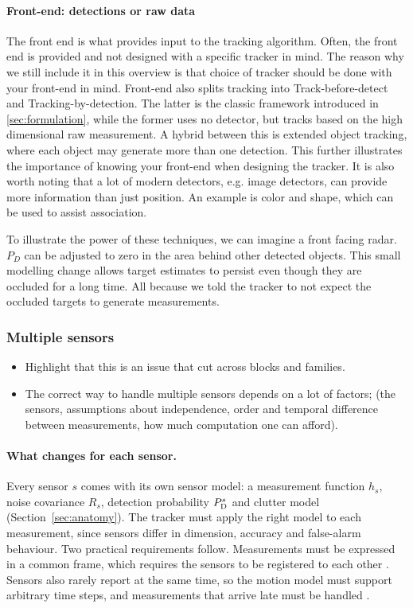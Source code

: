 \paragraph{Front-end: detections or raw data}
The front end is what provides input to the tracking algorithm. Often, the front end is provided and not designed with a specific tracker in mind. The reason why we still include it in this overview is that choice of tracker should be done with your front-end in mind. Front-end also splits tracking into Track-before-detect and Tracking-by-detection. The latter is the classic framework introduced in \autoref{sec:formulation}, while the former uses no detector, but tracks based on the high dimensional raw measurement. A hybrid between this is extended object tracking, where each object may generate more than one detection. This further illustrates the importance of knowing your front-end when designing the tracker. It is also worth noting that a lot of modern detectors, e.g. image detectors, can provide more information than just position. An example is color and shape, which can be used to assist association.

To illustrate the power of these techniques, we can imagine a front facing radar. $P_D$ can be adjusted to zero in the area behind other detected objects. This small modelling change allows target estimates to persist even though they are occluded for a long time. All because we told the tracker to not expect the occluded targets to generate measurements. 

\subsubsection{Multiple sensors}
\label{sec:multisensor}

\begin{itemize}
    \item Highlight that this is an issue that cut across blocks and families.
    \item The correct way to handle multiple sensors depends on a lot of factors; (the sensors, assumptions about independence, order and temporal difference between measurements, how much computation one can afford).
\end{itemize}

\paragraph{What changes for each sensor.} Every sensor $s$ comes with its own sensor model: a measurement function $h_s$, noise covariance $R_s$, detection probability $P_{\mathrm{D}}^{s}$ and clutter model (Section~\ref{sec:anatomy}). The tracker must apply the right model to each measurement, since sensors differ in dimension, accuracy and false-alarm behaviour. Two practical requirements follow. Measurements must be expressed in a common frame, which requires the sensors to be registered to each other . Sensors also rarely report at the same time, so the motion model must support arbitrary time steps, and measurements that arrive late must be handled .

